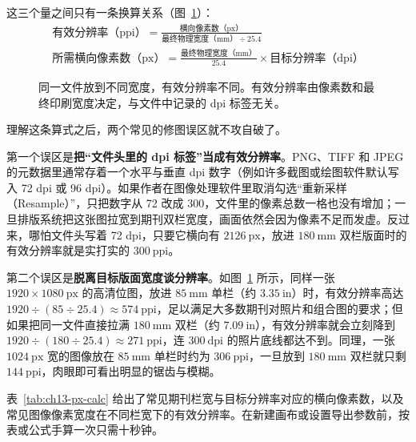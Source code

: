 这三个量之间只有一条换算关系（图~\ref{fig:ch13-01}）：
\begin{gather*}
\text{有效分辨率（ppi）} = \frac{\text{横向像素数（px）}}{\text{最终物理宽度（mm）} \div 25.4} \\[3pt]
\text{所需横向像素数（px）} = \frac{\text{最终物理宽度（mm）}}{25.4} \times \text{目标分辨率（dpi）}
\end{gather*}

\begin{figure}[htbp]\centering
\makebox[\linewidth][c]{}
\caption{同一文件放到不同宽度，有效分辨率不同。有效分辨率由像素数和最终印刷宽度决定，与文件中记录的 dpi 标签无关。}\label{fig:ch13-01}
\end{figure}

理解这条算式之后，两个常见的修图误区就不攻自破了。

第一个误区是\textbf{把“文件头里的 dpi 标签”当成有效分辨率}。PNG、TIFF 和 JPEG 的元数据里通常存着一个水平与垂直 dpi 数字（例如许多截图或绘图软件默认写入 72 dpi 或 96 dpi）。如果作者在图像处理软件里取消勾选“重新采样（Resample）”，只把数字从 72 改成 300，文件里的像素总数一格也没有增加；一旦排版系统把这张图拉宽到期刊双栏宽度，画面依然会因为像素不足而发虚。反过来，哪怕文件头写着 72 dpi，只要它横向有 $2126\ \text{px}$，放进 $180\ \text{mm}$ 双栏版面时的有效分辨率就是实打实的 $300\ \text{ppi}$。

第二个误区是\textbf{脱离目标版面宽度谈分辨率}。如图~\ref{fig:ch13-01} 所示，同样一张 $1920 \times 1080\ \text{px}$ 的高清位图，放进 $85\ \text{mm}$ 单栏（约 $3.35\ \text{in}$）时，有效分辨率高达 $1920 \div (85 \div 25.4) \approx 574\ \text{ppi}$，足以满足大多数期刊对照片和组合图的要求；但如果把同一文件直接拉满 $180\ \text{mm}$ 双栏（约 $7.09\ \text{in}$），有效分辨率就会立刻降到 $1920 \div (180 \div 25.4) \approx 271\ \text{ppi}$，连 $300\ \text{dpi}$ 的照片底线都达不到。同理，一张 $1024\ \text{px}$ 宽的图像放在 $85\ \text{mm}$ 单栏时约为 $306\ \text{ppi}$，一旦放到 $180\ \text{mm}$ 双栏就只剩 $144\ \text{ppi}$，肉眼即可看出明显的锯齿与模糊。

表~\ref{tab:ch13-px-calc} 给出了常见期刊栏宽与目标分辨率对应的横向像素数，以及常见图像像素宽度在不同栏宽下的有效分辨率。在新建画布或设置导出参数前，按表或公式手算一次只需十秒钟。

